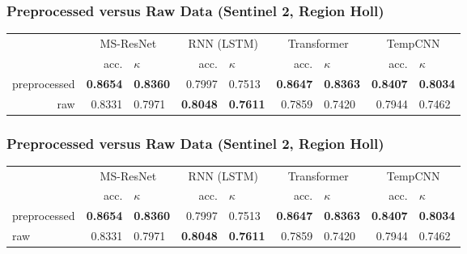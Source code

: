 \documentclass[%
  aspectratio=169,
  9pt,
ngerman,
  light,
  mathserif,
  professionalfont,
  affiliationintitlepagehead,
  titlegraphic,
   affiliation,
   navigationbar,
  progressbar,
]{beamer}
\begin{document}
{\begin{frame}
	\frametitle{Preprocessed versus Raw Data (Sentinel 2, Region Holl)}
	
	\begin{tabular}{rrlrlrlrl}
		\toprule
		 & \multicolumn{2}{c}{MS-ResNet} & \multicolumn{2}{c}{RNN (LSTM)} & \multicolumn{2}{c}{Transformer} & \multicolumn{2}{c}{TempCNN} \\
		 & acc. & $\kappa$ & acc. & $\kappa$ & acc. & $\kappa$ & acc. & $\kappa$ \\
		\cmidrule(lr){2-3}\cmidrule(lr){4-5} \cmidrule(lr){6-7}\cmidrule(lr){8-9}
		preprocessed & \textbf{0.8654} & \textbf{0.8360} & 0.7997 & 0.7513 & \textbf{0.8647} & \textbf{0.8363} & \textbf{0.8407} & \textbf{0.8034} \\
		raw 		 & 0.8331 & 0.7971 & \textbf{0.8048} & \textbf{0.7611} & 0.7859 & 0.7420 & 0.7944 & 0.7462 \\
		\bottomrule
	\end{tabular}
	
	
	
	
	
\end{frame}

\begin{frame}
\frametitle{Preprocessed versus Raw Data (Sentinel 2, Region Holl)}

\begin{tabular}{lrlrlrlrl}
	\toprule
	& \multicolumn{2}{c}{MS-ResNet} & \multicolumn{2}{c}{RNN (LSTM)} & \multicolumn{2}{c}{Transformer} & \multicolumn{2}{c}{TempCNN} \\
	& acc. & $\kappa$ & acc. & $\kappa$ & acc. & $\kappa$ & acc. & $\kappa$ \\
	\cmidrule(lr){2-3}\cmidrule(lr){4-5} \cmidrule(lr){6-7}\cmidrule(lr){8-9}
	preprocessed & \textbf{0.8654} & \textbf{0.8360} & 0.7997 & 0.7513 & \textbf{0.8647} & \textbf{0.8363} & \textbf{0.8407} & \textbf{0.8034} \\
	raw 		 & 0.8331 & 0.7971 & \textbf{0.8048} & \textbf{0.7611} & 0.7859 & 0.7420 & 0.7944 & 0.7462 \\
	\bottomrule
\end{tabular}


\end{frame}}
\end{document}
